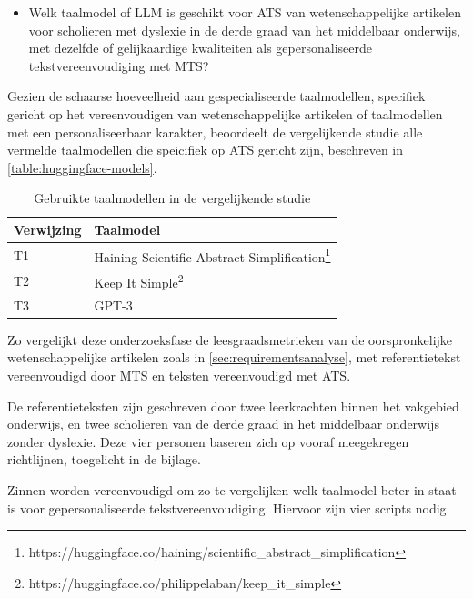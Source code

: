 \begin{itemize}
	\item Welk taalmodel of LLM is geschikt voor ATS van wetenschappelijke artikelen voor scholieren met dyslexie in de derde graad van het middelbaar onderwijs, met dezelfde of gelijkaardige kwaliteiten als gepersonaliseerde tekstvereenvoudiging met MTS?
\end{itemize}


Gezien de schaarse hoeveelheid aan gespecialiseerde taalmodellen, specifiek gericht op het vereenvoudigen van wetenschappelijke artikelen of taalmodellen met een personaliseerbaar karakter, beoordeelt de vergelijkende studie alle vermelde taalmodellen die speicifiek op ATS gericht zijn, beschreven in \ref{table:huggingface-models}. 

\begin{center}
	\begin{table}[H]
		\begin{tabular}{ | m{4cm} | m{12cm} | } 
			\hline
			\textbf{Verwijzing} & \textbf{Taalmodel} \\
			\hline
			T1 & Haining Scientific Abstract Simplification\footnote{https://huggingface.co/haining/scientific\_abstract\_simplification} \\
			\hline
			T2 & Keep It Simple\footnote{https://huggingface.co/philippelaban/keep\_it\_simple} \\
			\hline
			T3 & GPT-3 \\
			\hline
		\end{tabular}
		\caption{Gebruikte taalmodellen in de vergelijkende studie}
		\label{table:vergelijkende-studie-taalmodellen}
	\end{table}
\end{center}

\medspace

Zo vergelijkt deze onderzoeksfase de leesgraadsmetrieken van de oorspronkelijke wetenschappelijke artikelen zoals in \ref{sec:requirementsanalyse}, met referentietekst vereenvoudigd door MTS en teksten vereenvoudigd met ATS. 


\medspace 

De referentieteksten zijn geschreven door twee leerkrachten binnen het vakgebied onderwijs, en twee scholieren van de derde graad in het middelbaar onderwijs zonder dyslexie. Deze vier personen baseren zich op vooraf meegekregen richtlijnen, toegelicht in de bijlage. 

\medspace

Zinnen worden vereenvoudigd om zo te vergelijken welk taalmodel beter in staat is voor gepersonaliseerde tekstvereenvoudiging. Hiervoor zijn vier scripts nodig.

